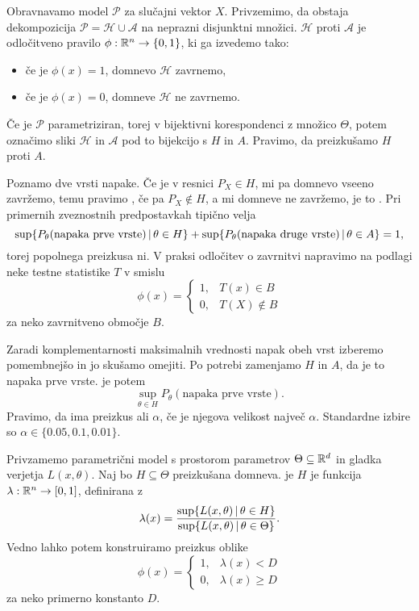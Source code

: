 
Obravnavamo model $\mathcal{P}$ za slučajni vektor $X$.
Privzemimo, da obstaja dekompozicija $\mathcal{P} = \mathcal{H} \cup
\mathcal{A}$ na neprazni disjunktni množici.
 $\mathcal{H}$ proti $\mathcal{A}$ je
odločitveno pravilo $\phi: \mathbb{R}^n \to \{0,1\}$, ki ga izvedemo tako:
\begin{itemize}
\item če je $\phi(x) = 1$, domnevo $\mathcal{H}$ zavrnemo,
\item če je $\phi(x) = 0$, domneve $\mathcal{H}$ ne zavrnemo.
\end{itemize}
Če je $\mathcal{P}$ parametriziran, torej v bijektivni korespondenci z množico
$\Theta$, potem označimo sliki $\mathcal{H}$ in $\mathcal{A}$ pod to bijekcijo s
$H$ in $A$.
Pravimo, da preizkušamo $H$ proti $A$.

Poznamo dve vrsti napake.
Če je v resnici $P_X \in H$, mi pa domnevo vseeno zavržemo, temu pravimo
, če pa $P_X \notin H$, a mi domneve ne zavržemo, je to
.
Pri primernih zveznostnih predpostavkah tipično velja
\[
  \sup \{ P_\theta(\text{napaka prve vrste}) \,|\, \theta \in H \}
  + \sup \{ P_\theta(\text{napaka druge vrste}) \,|\, \theta \in A \}
  = 1,
\]
torej popolnega preizkusa ni.
V praksi odločitev o zavrnitvi napravimo na podlagi neke testne statistike $T$ v
smislu
\[
  \phi(x) =
  \begin{cases}
	1, & T(x) \in B \\
	0, & T(X) \notin B
  \end{cases}
\]
za neko zavrnitveno območje $B$.

Zaradi komplementarnosti maksimalnih vrednosti napak obeh vrst izberemo
pomembnejšo in jo skušamo omejiti.
Po potrebi zamenjamo $H$ in $A$, da je to napaka prve vrste.
 je potem
\[
  \sup_{\theta \in H} P_\theta(\text{napaka prve vrste}).
\]
Pravimo, da ima preizkus  ali  $\alpha$, če je njegova velikost največ $\alpha$.
Standardne izbire so $\alpha \in \{ 0.05, 0.1, 0.01 \}$.


Privzamemo parametrični model s prostorom parametrov $\Theta \subseteq \mathbb{R}^d$ in
gladka verjetja $L(x,\theta)$.
Naj bo $H \subseteq \Theta$ preizkušana domneva.
 je $H$ je funkcija $\lambda: \mathbb{R}^n \to [0,1]$,
definirana z
\[
  \lambda(x) = \frac{
	\sup \{ L(x,\theta) \,|\, \theta \in H \}
  }{
	\sup \{ L(x,\theta) \,|\, \theta \in \Theta \}
  }.
\]
Vedno lahko potem konstruiramo preizkus oblike
\[
  \phi(x) =
  \begin{cases}
	1, & \lambda(x) < D \\
	0, & \lambda(x) \ge D
  \end{cases}
\]
za neko primerno konstanto $D$.

